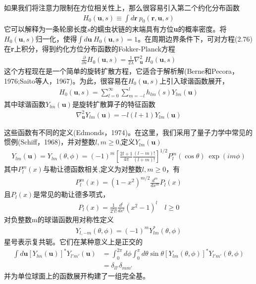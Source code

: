 \documentclass[12pt]{article}
\begin{document}
\begin{CJK}{UTF8}{gkai}
如果我们将注意力限制在方位相关性上，那么很容易引入第二个约化分布函数\\
\begin{gather}
H_0(\textbf{u},s)\equiv\int d\textbf{r}\ p_0(\textbf{r},\textbf{u},s)
\end{gather}
它可以解释为一条轮廓长度$s$的蠕虫状链的末端具有方位\textbf{u}的概率密度。将$H_0(\textbf{u},s)$归一化，使得$\int d\textbf{u}\  H_0(\textbf{u},s)=1$。在周期边界条件下，可对方程(2.76)在\textbf{r}上积分，得到约化方位分布函数的Fokker-Planck方程\\
\begin{gather}
\frac{\partial}{\partial s}H_0(\textbf{u},s)=\frac{1}{2\lambda}\nabla_\textbf{u}^2\ H_0(\textbf{u},s)
\end{gather}
这个方程现在是一个简单的旋转扩散方程，它适合于解析解(Berne和Pecora，1976;Saito等人，1967)。为此，很容易在$H_0(\textbf{u},s)$上引入球谐函数展开，\\
\begin{gather}
H_0(\textbf{u},s)=\sum_{l=0}^{\infty}\sum_{m=-l}^{l}h_{lm}(s)Y_{lm}(\textbf{u})
\end{gather}
其中球谐函数$Y_{lm}(\textbf{u})$是旋转扩散算子的特征函数
\begin{gather}
\nabla_\textbf{u}^2Y_{lm}(\textbf{u}) =-l(l+1)Y_{lm}(\textbf{u})
\end{gather}

这些函数有不同的定义(Edmonds，1974)。在这里，我们采用了量子力学中常见的惯例(Schiff，1968)，并对整数$l,m\geq 0$,定义$Y_{lm}(\textbf{u})$\\
\begin{gather}
Y_{lm}(\textbf{u}) = Y_{lm}(\theta,\phi)=(-1)^m\left[\frac{2l+1}{4\pi}\frac{(l-m)!}{(l+m)!}\right]^{1/2}P_l^m(\cos \theta )\ \exp(im\phi)
\end{gather}
其中$P_l^m(x)$与勒让德函数相关,定义为对整数$l,m\geq 0$，有\\
\begin{gather}
P_l^m(x)=(1-x^2)^{m/2}\frac{d^m}{dx^m}P_l(x)
\end{gather}
且$P_l(x)$是常见的勒让德多项式，\\
\begin{gather}
P_l(x)=\frac{1}{2^ll!}\frac{d^l}{dx^l}(x^2-1)^l\quad l\geq 0
\end{gather}
对负整数m的球谐函数用对称性定义\\
\begin{gather}
Y_{l,-m}(\theta,\phi) =(-1)^m Y_{lm}^*(\theta,\phi)
\end{gather}
星号表示复共轭。它们在某种意义上是正交的\\
\begin{equation}
\begin{aligned}
\int d\textbf{u} \left[Y_{lm}(\textbf{u})\right]^*Y_{l'm'}(\textbf{u})&=\int_{0}^{2\pi}d\phi\int_{0}^{\pi}d\theta\sin\theta\left[Y_{lm}(\theta,\phi)\right]^*Y_{l'm'}(\theta,\phi)\\&=\delta_{ll'}\delta_{mm'}
\end{aligned}
\end{equation}
并为单位球面上的函数展开构建了一组完全基。\\


\end{CJK}
\end{document}
